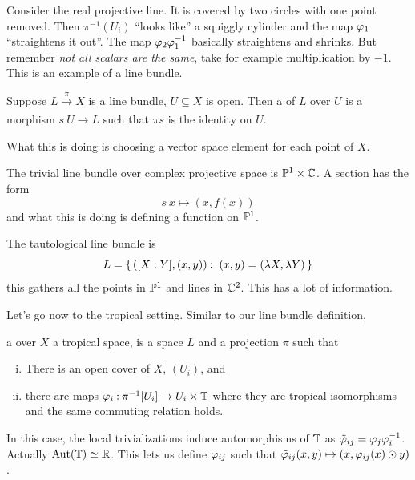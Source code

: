 \documentclass[12pt]{memoir}
\begin{document}
\begin{Ex}
    Consider the real projective line. It is covered by two circles with one point removed. Then $\pi^{-1}(U_i)$ ``looks like'' a squiggly cylinder and the map $\varphi_1$ ``straightens it out''. The map $\varphi_2\varphi_1^{-1}$ basically straightens and shrinks. But remember \emph{not all scalars are the same}, take for example multiplication by $-1$. This is an example of a line bundle.
\end{Ex}

\begin{Def}
    Suppose $L\xrightarrow[]{\pi}X$ is a line bundle, $U\subseteq X$ is open. Then a  of $L$ over $U$ is a morphism $s\: U\to L$ such that $\pi s$ is the identity on $U$.
\end{Def}

What this is doing is choosing a vector space element for each point of $X$.

\begin{Ex}
    The trivial line bundle over complex projective space is $\mathbb{P}^1\times\mathbb{C}$. A section has the form 
    $$s\: x\mapsto (x,f(x))$$
    and what this is doing is defining a function on $\mathbb{P}^1$.
\end{Ex}

\begin{Ex}
    The tautological line bundle is 
    $$L=\{\,([X:Y],(x,y))\mathbin{:}\ (x,y)=(\lambda X,\lambda Y)\,\}$$
    this gathers all the points in $\mathbb{P}^1$ and lines in $\mathbb{C}^2$. This has a lot of information. 
\end{Ex}

Let's go now to the tropical setting. Similar to our line bundle definition, 

\begin{Def}
a  over $X$ a tropical space, is a space $L$ and a projection $\pi$ such that 
\begin{enumerate}[i)]
    \item There is an open cover of $X$, $(U_i)$, and
    \item there are maps $\varphi_i\mathbin{:} \pi^{-1}[U_i]\to U_i\times\mathbb{T}$ where they are tropical isomorphisms and the same commuting relation holds.
\end{enumerate}    
\end{Def}

In this case, the local trivializations induce automorphisms of $\mathbb{T}$ as $\tilde{\varphi}_{ij}=\varphi_j\varphi_i^{-1}$. Actually $\operatorname{Aut}(\mathbb{T})\simeq \mathbb{R}$. This lets us define $\varphi_{ij}$ such that $\tilde{\varphi}_{ij}(x,y)\mapsto (x,\varphi_{ij}(x)\odot y)$.
\end{document}
